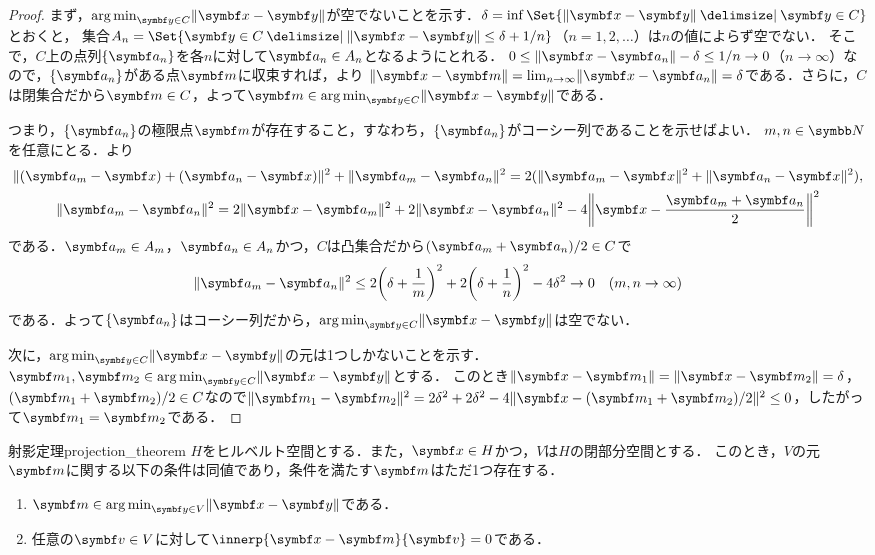 \documentclass[../../main]{subfiles}
\begin{document}
\begin{proof}
  まず，\(\argmin_{\vect{y}\in C}\vnorm{\vect{x}-\vect{y}}\)が空でないことを示す．\(\delta=\inf\Set{\vnorm{\vect{x}-\vect{y}}\given\vect{y}\in C}\)とおくと，
  集合\(A_n=\Set{\vect{y}\in C\given\vnorm{\vect{x}-\vect{y}}\leq\delta+1/n}\)（\(n=1,2,\dotsc\)）は\(n\)の値によらず空でない．
  そこで，\(C\)上の点列\(\seq{\vect{a}_n}\)を各\(n\)に対して\(\vect{a}_n\in A_n\)となるようにとれる．
  \(0\leq\vnorm{\vect{x}-\vect{a}_n}-\delta\leq 1/n\to 0\)（\(n\to\infty\)）なので，\(\seq{\vect{a}_n}\)がある点\(\vect{m}\)に収束すれば，より
  \(\vnorm{\vect{x}-\vect{m}}=\lim_{n\to\infty}\vnorm{\vect{x}-\vect{a}_n}=\delta\)である．さらに，\(C\)は閉集合だから\(\vect{m}\in C\)，よって\(\vect{m}\in\argmin_{\vect{y}\in C}\vnorm{\vect{x}-\vect{y}}\)である．

  つまり，\(\seq{\vect{a}_n}\)の極限点\(\vect{m}\)が存在すること，すなわち，\(\seq{\vect{a}_n}\)がコーシー列であることを示せばよい．
  \(m,n\in\numset{N}\)を任意にとる．より
  \begin{gather*}
    \vnorm{(\vect{a}_m-\vect{x})+(\vect{a}_n-\vect{x})}^2+\vnorm{\vect{a}_m-\vect{a}_n}^2 = 2(\vnorm{\vect{a}_m-\vect{x}}^2+\vnorm{\vect{a}_n-\vect{x}}^2), \\
    \vnorm{\vect{a}_m-\vect{a}_n}^2 = 2\vnorm{\vect{x}-\vect{a}_m}^2+2\vnorm{\vect{x}-\vect{a}_n}^2-4\vnorm*{\vect{x}-\frac{\vect{a}_m+\vect{a}_n}{2}}^2
  \end{gather*}
  である．\(\vect{a}_m\in A_m\)，\(\vect{a}_n\in A_n\)かつ，\(C\)は凸集合だから\((\vect{a}_m+\vect{a}_n)/2\in C\)で
  \[
    \vnorm{\vect{a}_m-\vect{a}_n}^2 \leq 2\pqty*{\delta+\frac{1}{m}}^2+2\pqty*{\delta+\frac{1}{n}}^2-4\delta^2
    \to 0\quad(m,n\to\infty)
  \]
  である．よって\(\seq{\vect{a}_n}\)はコーシー列だから，\(\argmin_{\vect{y}\in C}\vnorm{\vect{x}-\vect{y}}\)は空でない．

  次に，\(\argmin_{\vect{y}\in C}\vnorm{\vect{x}-\vect{y}}\)の元は1つしかないことを示す．\(\vect{m}_1,\vect{m}_2\in\argmin_{\vect{y}\in C}\vnorm{\vect{x}-\vect{y}}\)とする．
  このとき\(\vnorm{\vect{x}-\vect{m}_1}=\vnorm{\vect{x}-\vect{m}_2}=\delta\)，\((\vect{m}_1+\vect{m}_2)/2\in C\)なので\(\vnorm{\vect{m}_1-\vect{m}_2}^2=2\delta^2+2\delta^2-4\vnorm{\vect{x}-(\vect{m}_1+\vect{m}_2)/2}^2\leq 0\)，したがって\(\vect{m}_1=\vect{m}_2\)である．
\end{proof}

\begin{theorem}{射影定理}{projection_theorem}
  \(H\)をヒルベルト空間とする．また，\(\vect{x}\in H\)かつ，\(V\)は\(H\)の閉部分空間とする．
  このとき，\(V\)の元\(\vect{m}\)に関する以下の条件は同値であり，条件を満たす\(\vect{m}\)はただ1つ存在する．
  \begin{enumerate}
    \item \(\vect{m}\in\argmin_{\vect{y}\in V}\vnorm{\vect{x}-\vect{y}}\)である．
    \item 任意の\(\vect{v}\in V\)に対して\(\innerp{\vect{x}-\vect{m}}{\vect{v}}=0\)である．
  \end{enumerate}
\end{theorem}
\end{document}

